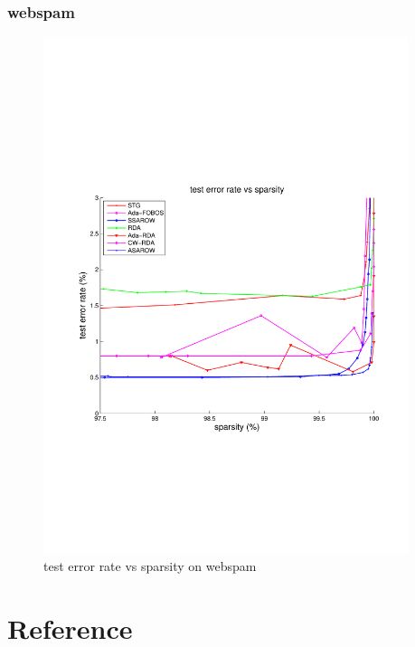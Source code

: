 \documentclass{article}
\begin{document}
\subsubsection{webspam}
\begin{figure}[!h]
\centering
\includegraphics[width=0.95\textwidth]{./figs/webspam_trigram_test.pdf}
\caption{test error rate vs sparsity on webspam}
\label{fig:04}
\end{figure}

\section{Reference}
\end{document}
